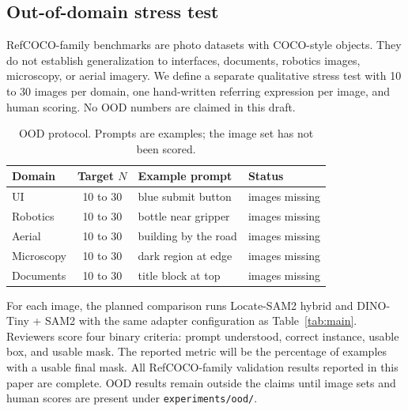 \subsection{Out-of-domain stress test}
\label{sec:ood}

RefCOCO-family benchmarks are photo datasets with COCO-style objects.
They do not establish generalization to interfaces, documents, robotics images, microscopy, or aerial imagery.
We define a separate qualitative stress test with 10 to 30 images per domain, one hand-written referring expression per image, and human scoring.
No OOD numbers are claimed in this draft.

\begin{table}[H]
  \centering
  \caption{OOD protocol. Prompts are examples; the image set has not been scored.}
  \label{tab:ood-domains}
  \scriptsize
  \begin{tabularx}{\textwidth}{@{}l c X l@{}}
    \toprule
    Domain & Target $N$ & Example prompt & Status \\
    \midrule
    UI         & 10 to 30 & blue submit button & images missing \\
    Robotics   & 10 to 30 & bottle near gripper & images missing \\
    Aerial     & 10 to 30 & building by the road & images missing \\
    Microscopy & 10 to 30 & dark region at edge & images missing \\
    Documents  & 10 to 30 & title block at top & images missing \\
    \bottomrule
  \end{tabularx}
\end{table}

For each image, the planned comparison runs Locate-SAM2 hybrid and DINO-Tiny + SAM2 with the same adapter configuration as Table~\ref{tab:main}.
Reviewers score four binary criteria: prompt understood, correct instance, usable box, and usable mask.
The reported metric will be the percentage of examples with a usable final mask.
All RefCOCO-family validation results reported in this paper are complete.
OOD results remain outside the claims until image sets and human scores are present under \texttt{experiments/ood/}.
